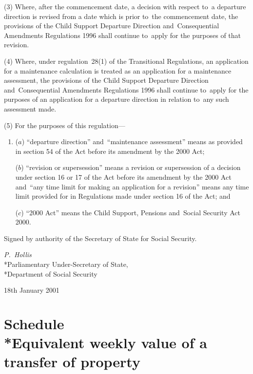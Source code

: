 \documentclass[12pt,a4paper]{article}
\begin{document}
(3) Where, after the commencement date, a decision with respect to~a departure direction is revised from a date which is prior to~the commencement date, the provisions of the Child Support Departure Direction and~Consequential Amendments Regulations 1996 shall continue to~apply for the purposes of that revision.

(4) Where, under regulation~28(1) of the Transitional Regulations, an application for a maintenance calculation is treated as an application for a maintenance assessment, the provisions of the Child Support Departure Direction and~Consequential Amendments Regulations 1996 shall continue to~apply for the purposes of an application for a departure direction in relation to~any such assessment made.

(5) For the purposes of this regulation—
\begin{enumerate}\item[]
($a$) “departure direction” and~“maintenance assessment” means as provided in section 54 of the Act before its amendment by the 2000 Act;

($b$) “revision or supersession” means a revision or supersession of a decision under section 16 or 17 of the Act before its amendment by the 2000 Act and~“any time limit for making an application for a revision” means any time limit provided for in Regulations made under section 16 of the Act; and

($c$) “2000 Act” means the Child Support, Pensions and~Social Security Act 2000. 
\end{enumerate}


\bigskip

Signed 
by authority of the Secretary of State for Social Security.

{\raggedleft
\emph{P.~Hollis}\\*Parliamentary Under-Secretary of State,\\*Department of Social Security

}

18th January 2001

\small

\part[Schedule~--- Equivalent weekly value of a transfer of property]{Schedule\\*Equivalent weekly value of a transfer of property}
\end{document}
